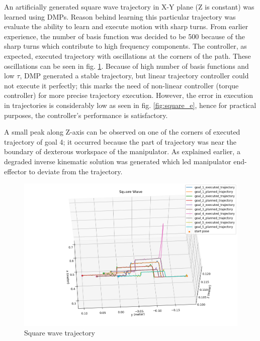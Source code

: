 An artificially generated square wave trajectory in X-Y plane (Z is constant) was learned using DMPs. Reason behind learning this particular trajectory was evaluate the ability to learn and execute motion with sharp turns. From earlier experience, the number of basis function was decided to be 500 because of the sharp turns which contribute to high frequency components. The controller, as expected, executed trajectory with oscillations at the corners of the path. These oscillations can be seen in fig. \ref{fig:square}. Because of high number of basis functions and low $\tau$, DMP generated a stable trajectory, but linear trajectory controller could not execute it perfectly; this marks the need of non-linear controller (torque controller) for more precise trajectory execution. However, the error in execution in trajectories is considerably low as seen in fig. \ref{fig:square_e}, hence for practical purposes, the controller's performance is satisfactory. 

A small peak along Z-axis can be observed on one of the corners of executed trajectory of goal 4; it occurred because the part of trajectory was near the boundary of dexterous workspace of the manipulator. As explained earlier, a degraded inverse kinematic solution was generated which led manipulator end-effector to deviate from the trajectory.


\begin{figure}[H]
	\centering
	\includegraphics[scale=0.6]{images/1/square.png}
	\caption{Square wave trajectory}
	\label{fig:square}
\end{figure}


